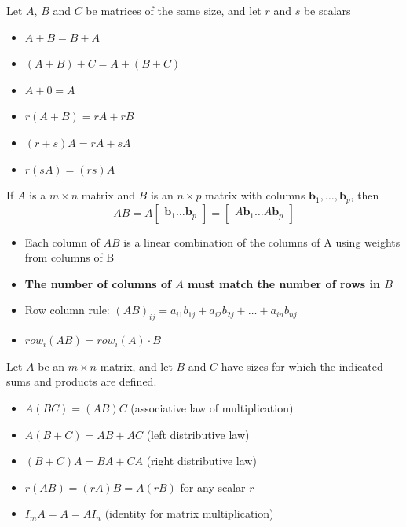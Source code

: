 \documentclass{report}
\begin{document}
\setcounter{theorem}{0}
\setcounter{definition}{0}
\begin{theorem}
\end{theorem}
\begin{tcolorbox}[colback=blue!5!white, colframe=blue!75!black, title=Properties of Matrices]
Let $A$, $B$ and $C$ be matrices of the same size, and let $r$ and $s$ be scalars
\begin{itemize}
    \item $A + B = B + A$
    \item $(A + B) + C = A + (B + C)$
    \item $A + 0 = A$
    \item $r(A + B) = rA + rB$
    \item $(r + s)A = rA + sA$
    \item $r(sA) = (rs)A$
\end{itemize}
\end{tcolorbox}

\begin{definition}
    If $A$ is a $m \times n$ matrix and $B$ is an $n \times p$ matrix with columns
$\mathbf{b}_1, \ldots, \mathbf{b}_p$, then
\[
AB = A\begin{bmatrix}\mathbf{b}_1 \ldots \mathbf{b}_p\end{bmatrix}
    = \begin{bmatrix}A\mathbf{b}_1 \ldots A\mathbf{b}_p\end{bmatrix}
\]
\end{definition}

\begin{itemize}
\item Each column of $AB$ is a linear combination of the columns of A using weights from columns of B
\item \textbf{The number of columns of $A$ must match the number of rows in $B$ }
\item Row column rule: $(AB)_{ij} = a_{i1}b_{1j} + a_{i2}b_{2j} + \ldots + a_{in}b_{nj}$
\item $row_i(AB) = row_i(A)\cdot B$
\end{itemize}

\begin{theorem}
\end{theorem}
\begin{tcolorbox}[colback=blue!5!white, colframe=blue!75!black, title=Properties of Matrices]
Let $A$ be an $m \times n$ matrix, and let $B$ and $C$ have sizes for which the indicated sums and products are defined.

\begin{itemize}
    \item[] $A(BC) = (AB)C$ \hfill (associative law of multiplication)
    \item[] $A(B + C) = AB + AC$ \hfill (left distributive law)
    \item[] $(B + C)A = BA + CA$ \hfill (right distributive law)
    \item[] $r(AB) = (rA)B = A(rB)$ for any scalar $r$
    \item[] $I_m A = A = A I_n$ \hfill (identity for matrix multiplication)
\end{itemize}
\end{tcolorbox}
\end{document}
